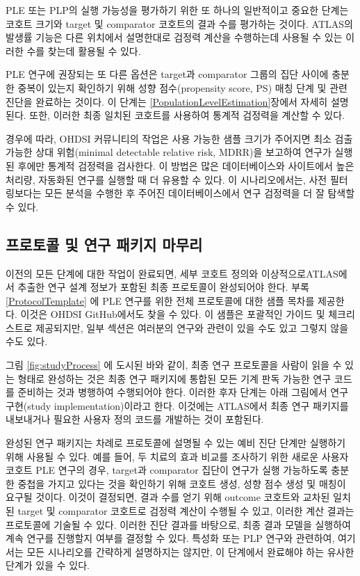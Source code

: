 \documentclass[11pt]{book}
\theoremstyle{definition}
\theoremstyle{definition}
\theoremstyle{definition}
\theoremstyle{remark}
\begin{document}
PLE 또는 PLP의 실행 가능성을 평가하기 위한 또 하나의 일반적이고 중요한
단계는 코호트 크기와 target 및 comparator 코호트의 결과 수를 평가하는
것이다. ATLAS의 발생률 기능은 다른 위치에서 설명한대로 검정력 계산을
수행하는데 사용될 수 있는 이러한 수를 찾는데 활용될 수 있다.

PLE 연구에 권장되는 또 다른 옵션은 target과 comparator 그룹의 집단
사이에 충분한 중복이 있는지 확인하기 위해 성향 점수(propensity score,
PS) 매칭 단계 및 관련 진단을 완료하는 것이다. 이 단계는
\ref{PopulationLevelEstimation}장에서 자세히 설명된다. 또한, 이러한 최종
일치된 코호트를 사용하여 통계적 검정력을 계산할 수 있다.

경우에 따라, OHDSI 커뮤니티의 작업은 사용 가능한 샘플 크기가 주어지면
최소 검출 가능한 상대 위험(minimal detectable relative risk, MDRR)을
보고하여 연구가 실행된 후에만 통계적 검정력을 검사한다. 이 방법은 많은
데이터베이스와 사이트에서 높은 처리량, 자동화된 연구를 실행할 때 더
유용할 수 있다. 이 시나리오에서는, 사전 필터링보다는 모든 분석을 수행한
후 주어진 데이터베이스에서 연구 검정력을 더 잘 탐색할 수 있다.

\subsection{프로토콜 및 연구 패키지 마무리}\label{----}

이전의 모든 단계에 대한 작업이 완료되면, 세부 코호트 정의와
이상적으로ATLAS에서 추출한 연구 설계 정보가 포함된 최종 프로토콜이
완성되어야 한다. 부록 \ref{ProtocolTemplate} 에 PLE 연구를 위한 전체
프로토콜에 대한 샘플 목차를 제공한다. 이것은 OHDSI GitHub에서도 찾을 수
있다. 이 샘플은 포괄적인 가이드 및 체크리스트로 제공되지만, 일부 섹션은
여러분의 연구와 관련이 있을 수도 있고 그렇지 않을 수도 있다.

그림 \ref{fig:studyProcess} 에 도시된 바와 같이, 최종 연구 프로토콜을
사람이 읽을 수 있는 형태로 완성하는 것은 최종 연구 패키지에 통합된 모든
기계 판독 가능한 연구 코드를 준비하는 것과 병행하여 수행되어야 한다.
이러한 후자 단계는 아래 그림에서 연구 구현(study implementation)이라고
한다. 이것에는 ATLAS에서 최종 연구 패키지를 내보내거나 필요한 사용자
정의 코드를 개발하는 것이 포함된다.

완성된 연구 패키지는 차례로 프로토콜에 설명될 수 있는 예비 진단 단계만
실행하기 위해 사용될 수 있다. 예를 들어, 두 치료의 효과 비교를 조사하기
위한 새로운 사용자 코호트 PLE 연구의 경우, target과 comparator 집단이
연구가 실행 가능하도록 충분한 중첩을 가지고 있다는 것을 확인하기 위해
코호트 생성, 성향 점수 생성 및 매칭이 요구될 것이다. 이것이 결정되면,
결과 수를 얻기 위해 outcome 코호트와 교차된 일치된 target 및 comparator
코호트로 검정력 계산이 수행될 수 있고, 이러한 계산 결과는 프로토콜에
기술될 수 있다. 이러한 진단 결과를 바탕으로, 최종 결과 모델을 실행하여
계속 연구를 진행할지 여부를 결정할 수 있다. 특성화 또는 PLP 연구와
관련하여, 여기서는 모든 시나리오를 간략하게 설명하지는 않지만, 이
단계에서 완료해야 하는 유사한 단계가 있을 수 있다.
\end{document}
